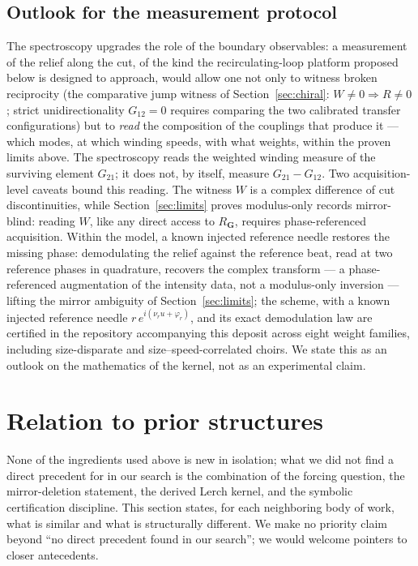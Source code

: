 \documentclass[11pt,a4paper]{article}
\begin{document}
\subsection{Outlook for the measurement protocol}
\label{sec:specoutlook}

The spectroscopy upgrades the role of the boundary observables: a
measurement of the relief along the cut, of the kind the
recirculating-loop platform proposed below is designed to approach,
would allow one not only to witness broken reciprocity (the comparative
jump witness of Section~\ref{sec:chiral}: $W \neq 0 \Rightarrow R \neq 0$;
strict unidirectionality $G_{12} = 0$ requires comparing the two calibrated
transfer configurations) but to \emph{read} the composition of the
couplings that produce it --- which modes, at which winding speeds, with
what weights, within the proven limits above. The spectroscopy reads the
weighted winding measure of the surviving element $G_{21}$; it does not, by
itself, measure $G_{21} - G_{12}$. Two acquisition-level caveats bound this
reading. The witness $W$ is a complex difference of cut discontinuities,
while Section~\ref{sec:limits} proves modulus-only records mirror-blind:
reading $W$, like any direct access to $R_{\mathbf{G}}$, requires
phase-referenced acquisition. Within the model, a known injected reference
needle restores the missing phase: demodulating the relief against the
reference beat, read at two reference phases in quadrature, recovers the
complex transform --- a phase-referenced augmentation of the intensity
data, not a modulus-only inversion --- lifting the mirror ambiguity of
Section~\ref{sec:limits}; the scheme, with a known injected reference
needle $r\,e^{i(\nu_r u + \varphi_r)}$, and its exact demodulation law are
certified in the repository accompanying this deposit across eight weight
families, including size-disparate and size--speed-correlated choirs. We state this as an
outlook on the mathematics of the kernel, not as an experimental claim.

\section{Relation to prior structures}
\label{sec:prior}

None of the ingredients used above is new in isolation; what we did not find a direct
precedent for in our search is the combination of the forcing question, the mirror-deletion
statement, the derived Lerch kernel, and the symbolic certification discipline.
This section states, for each neighboring body of work, what is similar and what
is structurally different. We make no priority claim beyond ``no direct precedent
found in our search''; we would welcome pointers to closer antecedents.
\end{document}

